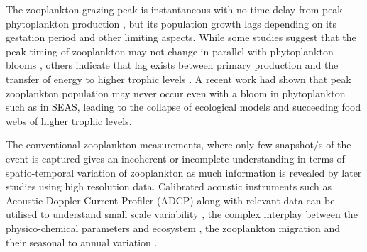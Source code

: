\documentclass{article}
\begin{document}
	The zooplankton grazing peak is instantaneous with no time delay from peak phytoplankton production \citep{li2000determines}, but its population growth lags \citep{rehim2012dynamical, almen2020temperature} depending on its gestation period and other limiting aspects. While some studies suggest that the peak timing of zooplankton may not change in parallel with phytoplankton blooms \citep{winder2004climatic}, others indicate that lag exists between primary production and the transfer of energy to higher trophic levels \citep{brock1992interannual, brock1991phytoplankton}. A recent work \citep{aparna2022seasonal} had shown that peak zooplankton population may never occur even with a bloom in phytoplankton such as in SEAS, leading to the collapse of ecological models and succeeding food webs of higher trophic levels.  
	
	The conventional zooplankton measurements, where only few snapshot/s of the event is captured gives an incoherent or incomplete understanding in terms of spatio-temporal variation of zooplankton \citep{ramamurthy1965studies, piontkovski1995spatial, madhupratap1992zooplankton,madhupratap1996lack,wishner1998mesozooplankton} as much information is revealed by later studies \citep{jyothibabu2010re, vijith2016consequences, shankar2019role, aparna2022seasonal} using high resolution data. Calibrated acoustic instruments such as Acoustic Doppler Current Profiler (ADCP) along with relevant data can be utilised to understand small scale variability \citep{nair1999arabian, edvardsen2003assessing, smith2005mesozooplankton, smeti2015spatial, kang2024acoustic}, the complex interplay between the physico-chemical parameters and ecosystem \citep{jiang2007temporal, potiris2018acoustic, shankar2019role, aparna2022seasonal, nie2023influence}, the zooplankton migration \citep{inoue2016diel,ursella2018evidence, ursella2021diel} and their seasonal to annual variation \citep{jiang2007temporal, hobbs2021marine,liu2022seasonal, aparna2022seasonal}.
	
\end{document}
